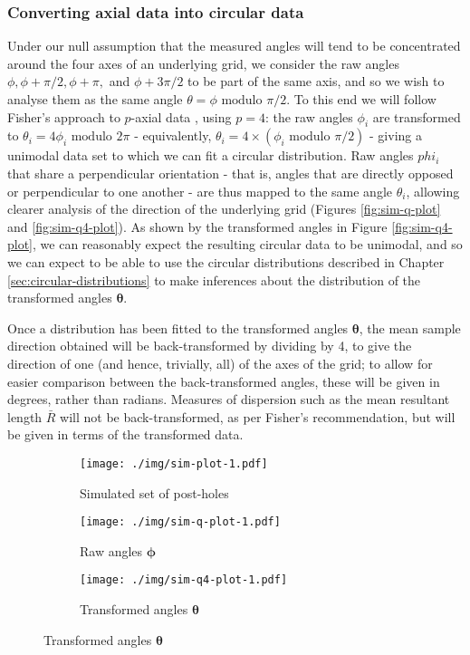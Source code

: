 \documentclass[../../ArchStats.tex]{subfiles}
\begin{document}
\subsubsection{Converting axial data into circular data}
Under our null assumption that the measured angles will tend to be concentrated around the four axes of an underlying grid, we consider the raw angles $\phi, \phi + \pi/2, \phi + \pi,$ and $\phi + 3\pi/2$ to be part of the same axis, and so we wish to analyse them as the same angle $\theta = \phi \text{ modulo }\pi/2$.
To this end we will follow Fisher's approach to $p$-axial data \cite{Fisher1993}, using $p=4$: the raw angles $\phi_i$ are transformed to $\theta_i = 4\phi_i \text{ modulo } 2\pi$ - equivalently, $\theta_i = 4 \times (\phi_i \text{ modulo }\pi/2)$ - giving a unimodal data set to which we can fit a circular distribution. Raw angles $phi_i$ that share a perpendicular orientation - that is, angles that are directly opposed or perpendicular to one another - are thus mapped to the same angle $\theta_i$, allowing clearer analysis of the direction of the underlying grid (Figures \ref{fig:sim-q-plot} and \ref{fig:sim-q4-plot}). As shown by the transformed angles in Figure \ref{fig:sim-q4-plot}, we can reasonably expect the resulting circular data to be unimodal, and so we can expect to be able to use the circular distributions described in Chapter \ref{sec:circular-distributions} to make inferences about the distribution of the transformed angles $\mathbf{\theta}$.

Once a distribution has been fitted to the transformed angles $\mathbf{\theta}$, the mean sample direction obtained will be back-transformed by dividing by 4, to give the direction of one (and hence, trivially, all) of the axes of the grid; to allow for easier comparison between the back-transformed angles, these will be given in degrees, rather than radians. Measures of dispersion such as the mean resultant length $\bar{R}$ will not be back-transformed, as per Fisher's recommendation, but will be given in terms of the transformed data.

\begin{figure}[h!]
\centering
\caption{Simulated set of buildings with post-holes 1m apart, with Gaussian $N(0,0.1)$ perturbation, and associated angles }
\label{fig:sim1}
\begin{subfigure}[t]{0.38\textwidth}
\caption{Simulated set of post-holes}
\label{fig:sim-plot-1}
\texttt{[image: ./img/sim-plot-1.pdf]}
\end{subfigure}
\begin{subfigure}[t]{0.3\textwidth}
\caption{Raw angles $\mathbf{\phi}$}
\label{fig:sim-q-plot-1}
\texttt{[image: ./img/sim-q-plot-1.pdf]}
\end{subfigure}
\begin{subfigure}[t]{0.3\textwidth}
\caption{Transformed angles $\mathbf{\theta}$}
\label{fig:sim-q4-plot-1}
\texttt{[image: ./img/sim-q4-plot-1.pdf]}
\end{subfigure}
\end{figure}
\end{document}
